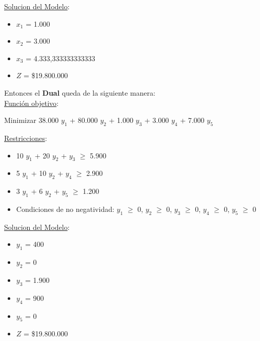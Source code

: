 \documentclass[10pt,a4paper]{article}
\begin{document}
\begin{enumerate}[label=\textbf{\sffamily\large\arabic*.}]
\begin{itemize}
    \end{itemize}

    \underline{Solucion del Modelo}: 

    \begin{itemize}

        \item $x_{1}$ = 1.000
        \item $x_{2}$ = 3.000
        \item $x_{3}$ = 4.333,333333333333
        \item $Z$ = \$19.800.000\\

    \end{itemize}

    \vspace{0.5em}

    Entonces el \textbf{Dual} queda de la siguiente manera: \\

    \underline{Función objetivo}: 

    \begin{center}
        
        Minimizar 38.000 $y_{1}$ + 80.000 $y_{2}$ + 1.000 $y_{3}$ + 3.000 $y_{4}$ + 7.000 $y_{5}$

    \end{center}

    \underline{Restricciones}: 

    \begin{itemize}

        \item 10 $y_{1}$ + 20 $y_{2}$ + $y_{3}$ $\geq$ 5.900
        \item 5 $y_{1}$ + 10 $y_{2}$ + $y_{4}$ $\geq$ 2.900
        \item 3 $y_{1}$ + 6 $y_{2}$ + $y_{5}$ $\geq$ 1.200
        \item Condiciones de no negatividad: $y_{1}$ $\geq$ 0, $y_{2}$ $\geq$ 0, $y_{3}$ $\geq$ 0, $y_{4}$ $\geq$ 0, $y_{5}$ $\geq$ 0\\

    \end{itemize}

    \underline{Solucion del Modelo}: 

    \begin{itemize}

        \item $y_{1}$ = 400
        \item $y_{2}$ = 0
        \item $y_{3}$ = 1.900
        \item $y_{4}$ = 900
        \item $y_{5}$ = 0
        \item $Z$ = \$19.800.000\\


\end{itemize}
\end{enumerate}
\end{document}
